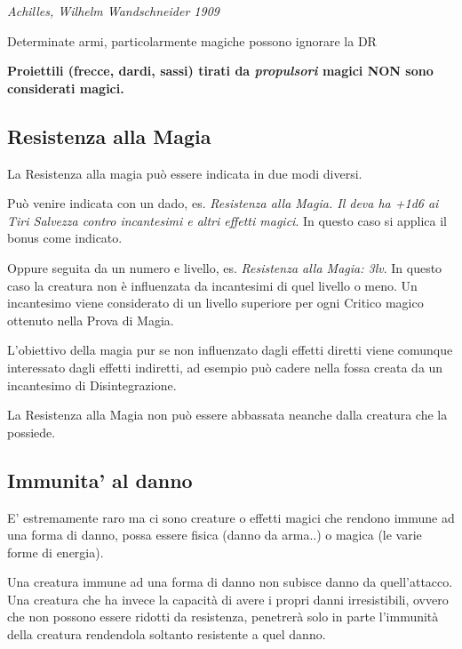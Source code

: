 \begin{multicols}{2}
\begin{center}
\emph{Achilles, Wilhelm Wandschneider 1909}


\end{center}


Determinate armi, particolarmente magiche possono ignorare la DR 

\medskip

\textbf{Proiettili (frecce, dardi, sassi) tirati da \emph{propulsori} magici NON sono considerati magici.}

\subsection{Resistenza alla Magia}\label{resistenzaallamagia}

La Resistenza alla magia può essere indicata in due modi diversi.

Può venire indicata con un dado, es. \emph{Resistenza alla Magia. Il deva ha +1d6 ai Tiri Salvezza contro incantesimi e altri effetti magici}. In questo caso si applica il bonus come indicato.

Oppure seguita da un numero e livello, es. \emph{Resistenza alla Magia: 3lv}. In questo caso la creatura non è influenzata da incantesimi di quel livello o meno. Un incantesimo viene considerato di un livello superiore per ogni Critico magico ottenuto nella Prova di Magia.

L'obiettivo della magia pur se non influenzato dagli effetti diretti viene comunque interessato dagli effetti indiretti, ad esempio può cadere nella fossa creata da un incantesimo di Disintegrazione.

La Resistenza alla Magia non può essere abbassata neanche dalla creatura che la possiede.

\subsection{Immunita' al danno}\label{immunitaaldanno}

E' estremamente raro ma ci sono creature o effetti magici che rendono immune ad una forma di danno, possa essere fisica (danno da arma..) o magica (le varie forme di energia).

Una creatura immune ad una forma di danno non subisce danno da quell'attacco. Una creatura che ha invece la capacità di avere i propri danni irresistibili, ovvero che non possono essere ridotti da resistenza, penetrerà solo in parte l'immunità della creatura rendendola soltanto resistente a quel danno.


\end{multicols}
